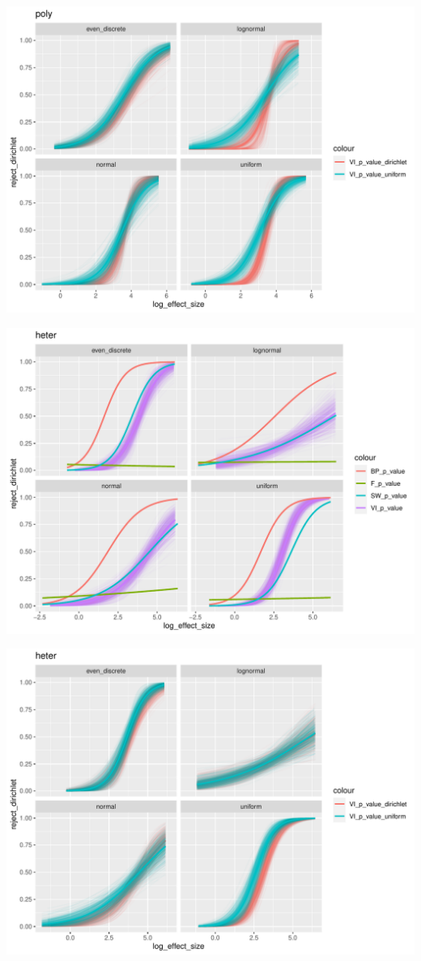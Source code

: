 \documentclass[]{interact}
\theoremstyle{plain}%
\theoremstyle{definition}
\theoremstyle{remark}
\begin{document}
\includegraphics[width=1\linewidth]{paper_comparison_files/figure-latex/unnamed-chunk-10-1}

\includegraphics[width=1\linewidth]{paper_comparison_files/figure-latex/unnamed-chunk-11-1}

\includegraphics[width=1\linewidth]{paper_comparison_files/figure-latex/unnamed-chunk-12-1}
\end{document}

